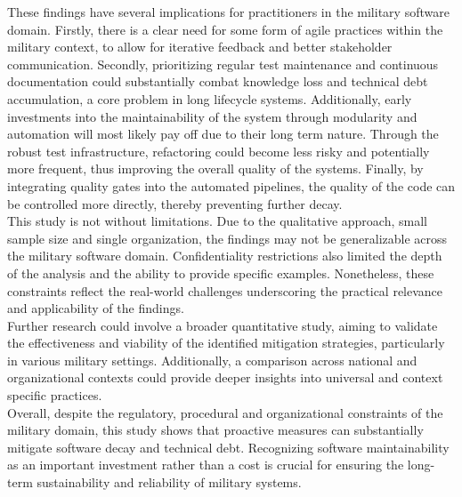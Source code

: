 These findings have several implications for practitioners in the military software domain. Firstly, there is a clear need for some form of agile practices within the military context, to allow for iterative feedback and better stakeholder communication.
Secondly, prioritizing regular test maintenance and continuous documentation could substantially combat knowledge loss and technical debt accumulation, a core problem in long lifecycle systems.
Additionally, early investments into the maintainability of the system through modularity and automation will most likely pay off due to their long term nature.
Through the robust test infrastructure, refactoring could become less risky and potentially more frequent, thus improving the overall quality of the systems.
Finally, by integrating quality gates into the automated pipelines, the quality of the code can be controlled more directly, thereby preventing further decay.\\

This study is not without limitations. Due to the qualitative approach, small sample size and single organization, the findings may not be generalizable across the military software domain. Confidentiality restrictions also limited the depth of the analysis and the ability to provide specific examples.
Nonetheless, these constraints reflect the real-world challenges underscoring the practical relevance and applicability of the findings.\\

Further research could involve a broader quantitative study, aiming to validate the effectiveness and viability of the identified mitigation strategies, particularly in various military settings.
Additionally, a comparison across national and organizational contexts could provide deeper insights into universal and context specific practices.\\

Overall, despite the regulatory, procedural and organizational constraints of the military domain, this study shows that proactive measures can substantially mitigate software decay and technical debt.
Recognizing software maintainability as an important investment rather than a cost is crucial for ensuring the long-term sustainability and reliability of military systems.
